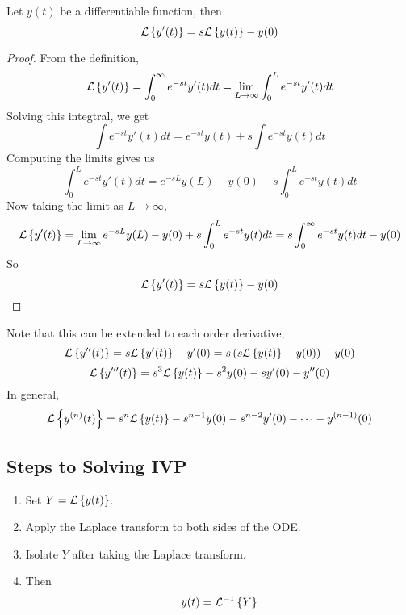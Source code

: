 \documentclass[openany]{report}
\begin{document}
\begin{theorem}
    Let $y(t)$ be a differentiable function, then 
    \[\mathcal{L}\left\{y'(t)\right\} = s\mathcal{L}\left\{y(t)\right\} - y(0)\]
\end{theorem}
\begin{proof}
    From the definition, 
    \[
        \mathcal{L}\left\{y'(t)\right\} = \int_0^\infty e^{-st}y'(t)dt = \lim_{L\rightarrow \infty}\int_0^L e^{-st}y'(t)dt
    \]
    Solving this integtral, we get 
    \[\int e^{-st}y'(t)dt = e^{-st}y(t) + s\int e^{-st}y(t)dt \]
    Computing the limits gives us 
    \[\int_0^L e^{-st}y'(t)dt = e^{-sL}y(L) - y(0) + s\int_0^L e^{-st}y(t)dt\]
    Now taking the limit as $L \rightarrow \infty$, 
    \[\mathcal{L}\left\{y'(t)\right\} = \lim_{L\rightarrow\infty} e^{-sL}y(L) - y(0) + s\int_0^L e^{-st}y(t)dt = s\int_0^\infty e^{-st}y(t)dt - y(0)\]
    So 
    \[\mathcal{L}\left\{y'(t)\right\} = s\mathcal{L}\left\{y(t)\right\} - y(0)\]
\end{proof}
Note that this can be extended to each order derivative, 
\[\mathcal{L}\left\{y''(t)\right\} = s\mathcal{L}\left\{y'(t)\right\} - y'(0) = s\left(s\mathcal{L}\left\{y(t)\right\} - y(0)\right) - y(0)\]
\[\mathcal{L}\left\{y'''(t)\right\} = s^3\mathcal{L}\left\{y(t)\right\} - s^2y(0) - sy'(0)-y''(0)\]
In general, 
\[\mathcal{L}\left\{y^{(n)}(t)\right\} = s^n\mathcal{L}\left\{y(t)\right\} - s^{n-1}y(0) - s^{n-2}y'(0) - \cdots - y^{(n-1)}(0)\]
\subsection{Steps to Solving IVP}
\begin{enumerate}
    \item Set $Y = \mathcal{L}\left\{y(t)\right\}$. 
    \item Apply the Laplace transform to both sides of the ODE. 
    \item Isolate $Y$ after taking the Laplace transform. 
    \item Then
    \[y(t) = \mathcal{L}^{-1}\left\{Y\right\}\]
\end{enumerate}
\end{document}
